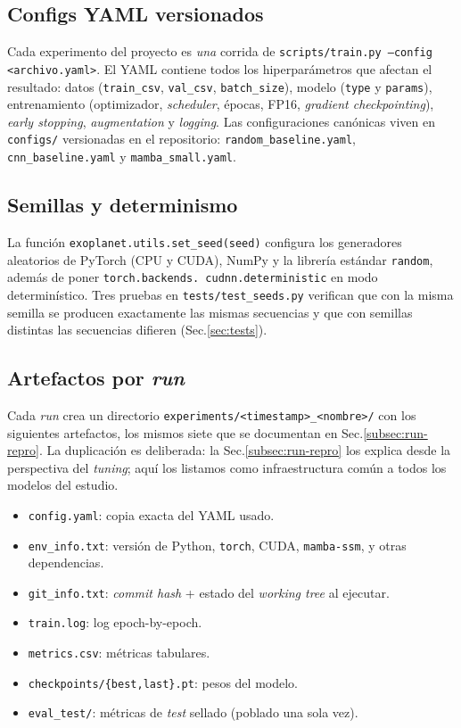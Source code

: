 \documentclass[11pt,a4paper]{article}
\begin{document}
\subsection{Configs YAML versionados}
\label{subsec:configs}

Cada experimento del proyecto es \textit{una} corrida de
\texttt{scripts/train.py --config <archivo.yaml>}. El YAML contiene
todos los hiperparámetros que afectan el resultado: datos
(\texttt{train\_csv}, \texttt{val\_csv}, \texttt{batch\_size}),
modelo (\texttt{type} y \texttt{params}), entrenamiento (optimizador,
\textit{scheduler}, épocas, FP16, \textit{gradient checkpointing}),
\textit{early stopping}, \textit{augmentation} y \textit{logging}.
Las configuraciones canónicas viven en \texttt{configs/} versionadas
en el repositorio:
\texttt{random\_baseline.yaml},
\texttt{cnn\_baseline.yaml} y
\texttt{mamba\_small.yaml}.

\subsection{Semillas y determinismo}
\label{subsec:seeds}

La función \texttt{exoplanet.utils.set\_seed(seed)} configura los
generadores aleatorios de PyTorch (CPU y CUDA), NumPy y la librería
estándar \texttt{random}, además de poner \texttt{torch.backends.\linebreak%
cudnn.deterministic} en modo determinístico. Tres pruebas en
\texttt{tests/test\_seeds.py} verifican que con la misma semilla se
producen exactamente las mismas secuencias y que con semillas
distintas las secuencias difieren (Sec.\ref{sec:tests}).

\subsection{Artefactos por \textit{run}}
\label{subsec:run-artifacts}

Cada \textit{run} crea un directorio
\texttt{experiments/<timestamp>\_<nombre>/} con los siguientes
artefactos, los mismos siete que se documentan en
Sec.\ref{subsec:run-repro}. La duplicación es deliberada: la
Sec.\ref{subsec:run-repro} los explica desde la perspectiva del
\textit{tuning}; aquí los listamos como infraestructura común a
todos los modelos del estudio.
\begin{itemize}
  \item \texttt{config.yaml}: copia exacta del YAML usado.
  \item \texttt{env\_info.txt}: versión de Python, \texttt{torch},
    CUDA, \texttt{mamba-ssm}, y otras dependencias.
  \item \texttt{git\_info.txt}: \textit{commit hash} + estado del
    \textit{working tree} al ejecutar.
  \item \texttt{train.log}: log epoch-by-epoch.
  \item \texttt{metrics.csv}: métricas tabulares.
  \item \texttt{checkpoints/\{best,last\}.pt}: pesos del modelo.
  \item \texttt{eval\_test/}: métricas de \textit{test} sellado
    (poblado una sola vez).
\end{itemize}
\end{document}

